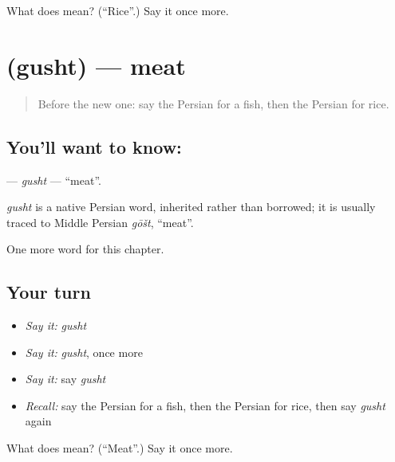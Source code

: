 \begin{tcolorbox}[breakable,colback=teal!4,colframe=teal!35!black,title={Before you move on}]
What does  mean? (\textquotedblleft{}Rice\textquotedblright{}.) Say it once more.
\end{tcolorbox}
\section[\texorpdfstring{\fa{گوشت} (gusht)}{گوشت (gusht)}]{ (gusht) — meat}

\label{lesson:FA-C40-gusht}



\begin{quote}
Before the new one: say the Persian for a fish, then the Persian for rice.
\end{quote}

\subsection*{You'll want to know: }
\textbf{} — \emph{gusht} — \textquotedblleft{}meat\textquotedblright{}.

\begin{cousinweb}
\emph{gusht} is a native Persian word, inherited rather than borrowed; it is usually traced to Middle Persian \emph{gōšt}, \textquotedblleft{}meat\textquotedblright{}.
\end{cousinweb}

\begin{grammarlens}[title={What you've built}]
One more word for this chapter.
\end{grammarlens}

\subsection*{Your turn}
\begin{itemize}
\raggedright
  \item \emph{Say it:} \emph{gusht}
  \item \emph{Say it:} \emph{gusht}, once more
  \item \emph{Say it:} say \emph{gusht}
  \item \emph{Recall:} say the Persian for a fish, then the Persian for rice, then say \emph{gusht} again
\end{itemize}

\begin{tcolorbox}[breakable,colback=teal!4,colframe=teal!35!black,title={Before you move on}]
What does  mean? (\textquotedblleft{}Meat\textquotedblright{}.) Say it once more.
\end{tcolorbox}
